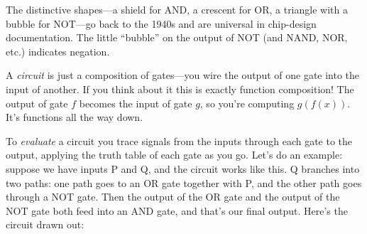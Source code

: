 \documentclass[11pt]{article}
\begin{document}
\begin{center}
\end{center}

The distinctive shapes---a shield for AND, a crescent for OR, a triangle with a bubble for NOT---go back to the 1940s and are universal in chip-design documentation. The little ``bubble'' on the output of NOT (and NAND, NOR, etc.) indicates negation.

A \emph{circuit} is just a composition of gates---you wire the output of one gate into the input of another. If you think about it this is exactly function composition! The output of gate $f$ becomes the input of gate $g$, so you're computing $g(f(x))$. It's functions all the way down.

To \emph{evaluate} a circuit you trace signals from the inputs through each gate to the output, applying the truth table of each gate as you go. Let's do an example: suppose we have inputs P and Q, and the circuit works like this. Q branches into two paths: one path goes to an OR gate together with P, and the other path goes through a NOT gate. Then the output of the OR gate and the output of the NOT gate both feed into an AND gate, and that's our final output. Here's the circuit drawn out:

\begin{center}
\end{center}
\end{document}
